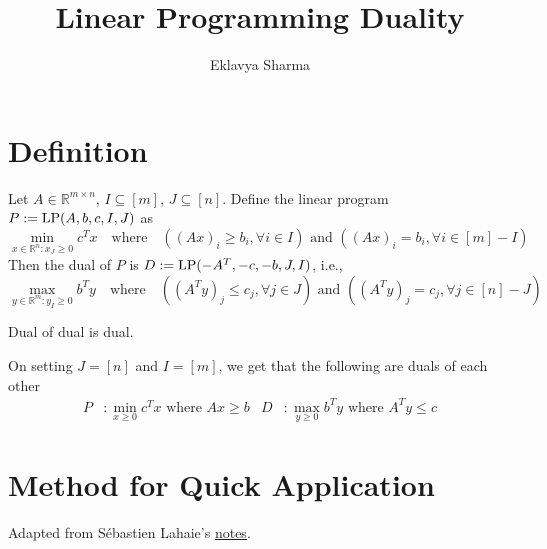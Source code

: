 \documentclass[a4paper,12pt,fleqn]{article}
\author{Eklavya Sharma}
\date{\empty}
\title{Linear Programming Duality}
\DeclareMathOperator{\LP}{LP}
\begin{document}
\maketitle
\setlength{\parskip}{0.2em}

\section{Definition}

Let $A \in \mathbb{R}^{m \times n}$, $I \subseteq [m]$, $J \subseteq [n]$.
Define the linear program $P \defeq \LP(A, b, c, I, J)$ as
\[ \min_{x \in \mathbb{R}^n: x_J \ge 0} c^Tx \quad\textrm{where}\quad
((Ax)_i \ge b_i, \forall i \in I) \textrm{ and } ((Ax)_i = b_i, \forall i \in [m]-I) \]
Then the dual of $P$ is $D \defeq \LP(-A^T, -c, -b, J, I)$, i.e.,
\[ \max_{y \in \mathbb{R}^m: y_I \ge 0} b^Ty \quad\textrm{where}\quad
((A^Ty)_j \le c_j, \forall j \in J) \textrm{ and } ((A^Ty)_j = c_j, \forall j \in [n]-J) \]

\begin{lemma}
Dual of dual is dual.
\end{lemma}

On setting $J = [n]$ and $I = [m]$, we get that the
following are duals of each other
\begin{align*}
P &: \min_{x \ge 0} c^Tx \textrm{ where } Ax \ge b
& D&: \max_{y \ge 0} b^Ty \textrm{ where } A^Ty \le c
\end{align*}

\section{Method for Quick Application}

Adapted from S\'ebastien Lahaie's \href{http://www.cs.columbia.edu/coms6998-3/lpprimer.pdf}{notes}.
\end{document}
